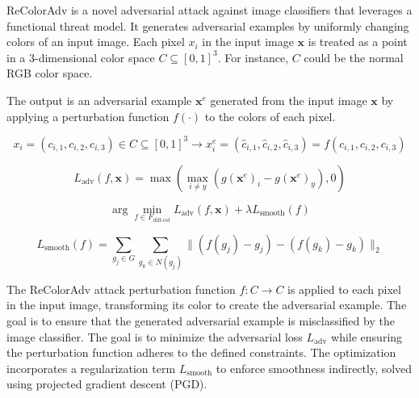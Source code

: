 
ReColorAdv is a novel adversarial attack against image classifiers that leverages a functional threat model. It generates adversarial examples by uniformly changing colors of an input image. Each pixel $x_i$ in the input image $\mathbf{x}$ is treated as a point in a 3-dimensional color space $C \subseteq [0, 1]^3$. For instance, $C$ could be the normal RGB color space.

The output is an adversarial example $\mathbf{x}^e$ generated from the input image $\mathbf{x}$ by applying a perturbation function $f(\cdot)$ to the colors of each pixel.

\begin{equation}
x_i = (c_{i,1}, c_{i,2}, c_{i,3}) \in C \subseteq [0, 1]^3 \rightarrow x_i^e = (\hat{c}_{i,1}, \hat{c}_{i,2}, \hat{c}_{i,3}) = f(c_{i,1}, c_{i,2}, c_{i,3})
\end{equation}

\begin{equation}
L_{\text{adv}}(f, \mathbf{x}) = \max \left( \max_{i \neq y} (g(\mathbf{x}^e)_i - g(\mathbf{x}^e)_y), 0 \right)
\end{equation}

\begin{equation}
\arg\min_{f \in F_{\text{diff-col}}} L_{\text{adv}}(f, \mathbf{x}) + \lambda L_{\text{smooth}}(f)
\end{equation}

\begin{equation}
L_{\text{smooth}}(f) = \sum_{g_j \in G} \sum_{g_k \in N(g_j)} \| (f(g_j) - g_j) - (f(g_k) - g_k) \|_2
\end{equation}

The ReColorAdv attack perturbation function $f: C \rightarrow C$ is applied to each pixel in the input image, transforming its color to create the adversarial example. The goal is to ensure that the generated adversarial example is misclassified by the image classifier. The goal is to minimize the adversarial loss $L_{\text{adv}}$ while ensuring the perturbation function adheres to the defined constraints. The optimization incorporates a regularization term $L_{\text{smooth}}$ to enforce smoothness indirectly, solved using projected gradient descent (PGD).